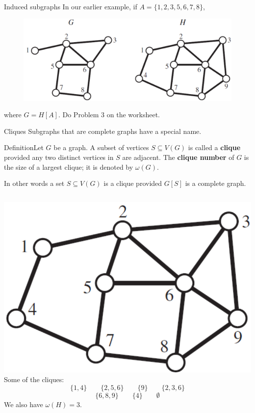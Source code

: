 \documentclass{beamer}
\def\bl[#1]#2{\begin{block}{#1}#2\end{block}}
\begin{document}
\begin{frame}{Induced subgraphs}
In our earlier example, if $A=\{1,2,3,5,6,7,8\}$,
\begin{figure}
\centering
\includegraphics[scale=0.4]{InducedSubgraph.pdf}
\end{figure}
where $G=H[A]$.
\center Do Problem 3 on the worksheet.
\end{frame}

\begin{frame}{Cliques}
Subgraphs that are complete graphs have a special name.
\bl[Definition]{Let $G$ be a graph. A subset of vertices $S\subseteq V(G)$ is called a \textbf{clique} provided any two distinct vertices in $S$ are adjacent. The \textbf{clique number} of $G$ is the size of a largest clique; it is denoted by $\omega(G)$.}
In other words a set $S\subseteq V(G)$ is a clique provided $G[S]$ is a complete graph.
\begin{columns}
\includegraphics[scale=0.3]{subgraphexample2.pdf}
Some of the cliques:
\[
\{1,4\}\qquad\{2,5,6\}\qquad \{9\}\qquad\{2,3,6\}
\]
\[
\{6,8,9\}\qquad\{4\}\qquad\emptyset
\]
We also have $\omega(H)=3$.
\end{columns}
\end{frame}
\end{document}
